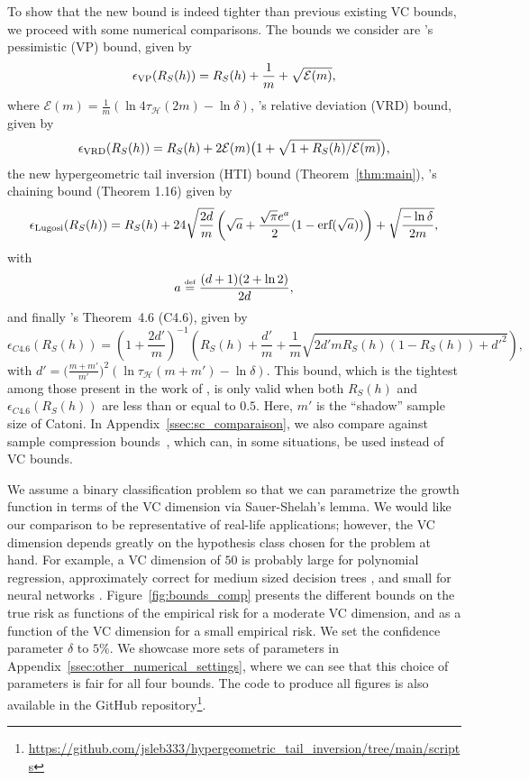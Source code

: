 \documentclass[twoside,11pt]{article}
\newcommand{\pr}[1]{\left(#1\right)}
\newcommand{\E}{\mathcal{E}}
\renewcommand{\H}{{\mathcal{H}}}
\newcommand{\eqdef}{\overset{\smash{\mbox{\tiny \rm def}}}{=}}
\begin{document}
To show that the new bound is indeed tighter than previous existing VC bounds, we proceed with some numerical comparisons.
The bounds we consider are \citeauthor{vapnik98}'s pessimistic (VP) bound, given by
\begin{equation*}
    \epsilon_\textnormal{VP}(R_S(h)) = R_S(h) + \frac{1}{m} + \sqrt{\E(m)},
\end{equation*}
where $\E(m) = \frac{1}{m}( \ln 4\tau_\H(2m) - \ln \delta )$, \citeauthor{vapnik98}'s relative deviation (VRD) bound, given by
\begin{equation*}
    \epsilon_\textnormal{VRD}(R_S(h)) = R_S(h) + 2\E(m)\big(1 + \sqrt{1 + R_S(h)/\E(m)} \big),
\end{equation*}
the new hypergeometric tail inversion (HTI) bound (Theorem~\ref{thm:main}), \citet{lugosi2002pattern}'s chaining bound (Theorem 1.16) given by
\begin{equation*}
    \epsilon_\textnormal{Lugosi}(R_S(h)) = R_S(h) + 24\sqrt{\frac{2d}{m}} \pr{ \sqrt{a} + \frac{\sqrt{\pi} e^a}{2} (1- \text{erf}(\sqrt{a})) } + \sqrt{\frac{-\ln \delta}{2m}},
\end{equation*}
with
\begin{equation*}
    a \eqdef \frac{(d+1)(2+\ln2)}{2d},
\end{equation*}
and finally \citet{catoni2004improved}'s Theorem~4.6 (C4.6), given by
\begin{equation*}
    \epsilon_{C4.6}(R_S(h)) = \pr{1 + \frac{2d'}{m}}^{-1} \pr{ R_S(h) + \frac{d'}{m} + \frac{1}{m}\sqrt{2d'mR_S(h)(1-R_S(h)) + d'^2} },
\end{equation*}
with $d' = \big(\frac{m+m'}{m'}\big)^2\pr{\ln \tau_\H(m+m') - \ln \delta}$.
This bound, which is the tightest among those present in the work of \citet{catoni2004improved}, is only valid when both $R_S(h)$ and $\epsilon_{C4.6}(R_S(h))$ are less than or equal to $0.5$.
Here, $m'$ is the ``shadow'' sample size of Catoni.
In Appendix~\ref{ssec:sc_comparaison}, we also compare against sample compression bounds~\citep{floyd95sample}, which can, in some situations, be used instead of VC bounds.

We assume a binary classification problem so that we can parametrize the growth function in terms of the VC dimension via Sauer-Shelah's lemma.
We would like our comparison to be representative of real-life applications; however, the VC dimension depends greatly on the hypothesis class chosen for the problem at hand.
For example, a VC dimension of $50$ is probably large for polynomial regression, approximately correct for medium sized decision trees \citep{leboeuf2020decision}, and small for neural networks \citep{bartlett2019nearly}.
Figure~\ref{fig:bounds_comp} presents the different bounds on the true risk as functions of the empirical risk for a moderate VC dimension, and as a function of the VC dimension for a small empirical risk.
We set the confidence parameter $\delta$ to $5\%$.
We showcase more sets of parameters in Appendix~\ref{ssec:other_numerical_settings}, where we can see that this choice of parameters is fair for all four bounds.
The code to produce all figures is also available in the GitHub repository\footnote{\url{https://github.com/jsleb333/hypergeometric_tail_inversion/tree/main/scripts}}.
\end{document}

